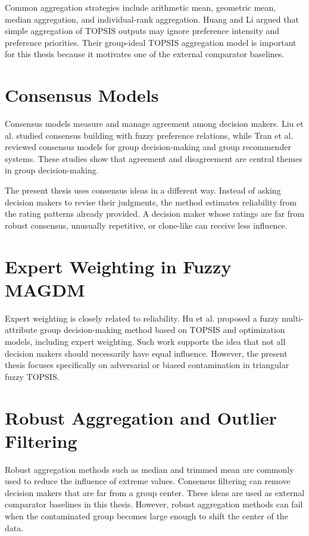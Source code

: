 Common aggregation strategies include arithmetic mean, geometric mean, median aggregation, and individual-rank aggregation. Huang and Li \cite{huang2012} argued that simple aggregation of TOPSIS outputs may ignore preference intensity and preference priorities. Their group-ideal TOPSIS aggregation model is important for this thesis because it motivates one of the external comparator baselines.

\section{Consensus Models}

Consensus models measure and manage agreement among decision makers. Liu et al. \cite{liu2022} studied consensus building with fuzzy preference relations, while Tran et al. \cite{tran2024} reviewed consensus models for group decision-making and group recommender systems. These studies show that agreement and disagreement are central themes in group decision-making.

The present thesis uses consensus ideas in a different way. Instead of asking decision makers to revise their judgments, the method estimates reliability from the rating patterns already provided. A decision maker whose ratings are far from robust consensus, unusually repetitive, or clone-like can receive less influence.

\section{Expert Weighting in Fuzzy MAGDM}

Expert weighting is closely related to reliability. Hu et al. \cite{hu2023} proposed a fuzzy multi-attribute group decision-making method based on TOPSIS and optimization models, including expert weighting. Such work supports the idea that not all decision makers should necessarily have equal influence. However, the present thesis focuses specifically on adversarial or biased contamination in triangular fuzzy TOPSIS.

\section{Robust Aggregation and Outlier Filtering}

Robust aggregation methods such as median and trimmed mean are commonly used to reduce the influence of extreme values. Consensus filtering can remove decision makers that are far from a group center. These ideas are used as external comparator baselines in this thesis. However, robust aggregation methods can fail when the contaminated group becomes large enough to shift the center of the data.

